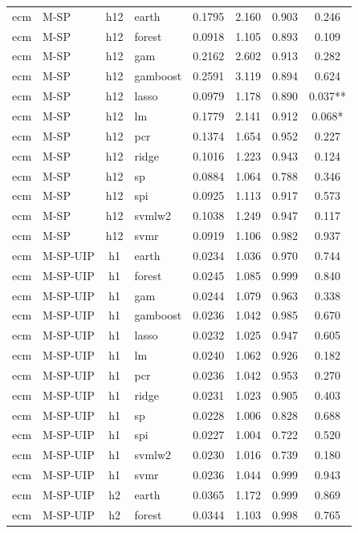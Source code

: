 \begin{ThreePartTable}
\begin{longtable}[t]{llclcccc}
\addlinespace
ecm & M-SP & h12 & earth & 0.1795 & 2.160 & 0.903 & 0.246\\
ecm & M-SP & h12 & forest & 0.0918 & 1.105 & 0.893 & 0.109\\
ecm & M-SP & h12 & gam & 0.2162 & 2.602 & 0.913 & 0.282\\
ecm & M-SP & h12 & gamboost & 0.2591 & 3.119 & 0.894 & 0.624\\
ecm & M-SP & h12 & lasso & 0.0979 & 1.178 & 0.890 & 0.037**\\
ecm & M-SP & h12 & lm & 0.1779 & 2.141 & 0.912 & 0.068*\\
ecm & M-SP & h12 & pcr & 0.1374 & 1.654 & 0.952 & 0.227\\
ecm & M-SP & h12 & ridge & 0.1016 & 1.223 & 0.943 & 0.124\\
ecm & M-SP & h12 & sp & 0.0884 & 1.064 & 0.788 & 0.346\\
ecm & M-SP & h12 & spi & 0.0925 & 1.113 & 0.917 & 0.573\\
ecm & M-SP & h12 & svmlw2 & 0.1038 & 1.249 & 0.947 & 0.117\\
ecm & M-SP & h12 & svmr & 0.0919 & 1.106 & 0.982 & 0.937\\
\addlinespace
ecm & M-SP-UIP & h1 & earth & 0.0234 & 1.036 & 0.970 & 0.744\\
ecm & M-SP-UIP & h1 & forest & 0.0245 & 1.085 & 0.999 & 0.840\\
ecm & M-SP-UIP & h1 & gam & 0.0244 & 1.079 & 0.963 & 0.338\\
ecm & M-SP-UIP & h1 & gamboost & 0.0236 & 1.042 & 0.985 & 0.670\\
ecm & M-SP-UIP & h1 & lasso & 0.0232 & 1.025 & 0.947 & 0.605\\
ecm & M-SP-UIP & h1 & lm & 0.0240 & 1.062 & 0.926 & 0.182\\
ecm & M-SP-UIP & h1 & pcr & 0.0236 & 1.042 & 0.953 & 0.270\\
ecm & M-SP-UIP & h1 & ridge & 0.0231 & 1.023 & 0.905 & 0.403\\
ecm & M-SP-UIP & h1 & sp & 0.0228 & 1.006 & 0.828 & 0.688\\
ecm & M-SP-UIP & h1 & spi & 0.0227 & 1.004 & 0.722 & 0.520\\
ecm & M-SP-UIP & h1 & svmlw2 & 0.0230 & 1.016 & 0.739 & 0.180\\
ecm & M-SP-UIP & h1 & svmr & 0.0236 & 1.044 & 0.999 & 0.943\\
\addlinespace
ecm & M-SP-UIP & h2 & earth & 0.0365 & 1.172 & 0.999 & 0.869\\
ecm & M-SP-UIP & h2 & forest & 0.0344 & 1.103 & 0.998 & 0.765\\

\end{longtable}
\end{ThreePartTable}
